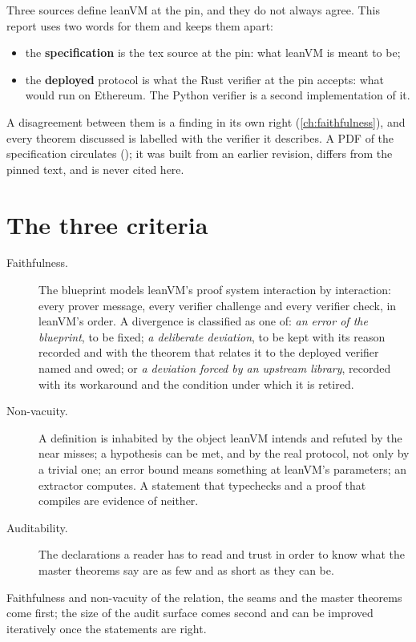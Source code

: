 Three sources define leanVM at the pin, and they do not always agree. This report uses two words
for them and keeps them apart:
\begin{itemize}
\item the \textbf{specification} is the tex source at the pin: what leanVM is meant to be;
\item the \textbf{deployed} protocol is what the Rust verifier at the pin accepts: what would run
  on Ethereum. The Python verifier is a second implementation of it.
\end{itemize}
A disagreement between them is a finding in its own right (\cref{ch:faithfulness}), and every
theorem discussed is labelled with the verifier it describes. A PDF of the specification
circulates (); it was built from an earlier revision, differs from the
pinned text, and is never cited here.

\section{The three criteria}

\begin{description}
\item[Faithfulness.] The blueprint models leanVM's proof system interaction by interaction: every
  prover message, every verifier challenge and every verifier check, in leanVM's order.
  A divergence is classified as one of: \emph{an error of the blueprint}, to be fixed;
  \emph{a deliberate deviation}, to be kept with its reason recorded and with the theorem that
  relates it to the deployed verifier named and owed; or \emph{a deviation forced by an upstream
  library}, recorded with its workaround and the condition under which it is retired.
\item[Non-vacuity.] A definition is inhabited by the object leanVM intends and refuted by the
  near misses; a hypothesis can be met, and by the real protocol, not only by a trivial one; an
  error bound means something at leanVM's parameters; an extractor computes. A statement that
  typechecks and a proof that compiles are evidence of neither.
\item[Auditability.] The declarations a reader has to read and trust in order to know what the
  master theorems say are as few and as short as they can be.
\end{description}
Faithfulness and non-vacuity of the relation, the seams and the master theorems come first;
the size of the audit surface comes second and can be improved iteratively once the statements
are right.

